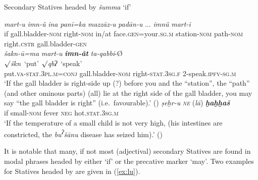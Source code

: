 \documentclass[output=paper,colorlinks,citecolor=brown]{langscibook}
\begin{document}
\begin{exe}  \ex Secondary Statives headed by \textit{šumma} `if' \label{ex:secondarystativescollection}
  \begin{xlist} \ex \label{ex:summaa} \gll {} \textit{mart-u} \textit{imn-û} \textit{ina} \textit{panī=ka} \textit{mazzāz-u} \textit{padān-u} ... \textit{imnû} \textit{mart-i}    \\
  if {gall.bladder}-\textsc{nom} right-\textsc{nom} in/at face.\textsc{gen}=your.\textsc{sg.m}    station-\textsc{nom}  path-\textsc{nom} {} right.\textsc{cstr} {gall.bladder}-\textsc{gen} \\
  \glll     \textit{šakn-ū=ma} \textit{mart-u} {\textit{\textbf{imn-ât}}} \textit{ta-qabbi}-Ø\\
   ${\surd}$\textit{škn}~`put' {} {}  
      ${\surd}$\textit{qbʔ}~`speak' \\
 put.\textsc{va-stat.3pl.m=conj}   {gall.bladder}-\textsc{nom} right-\textsc{stat.3sg.f}       2-speak.\textsc{ipfv-sg.m}\\
    \glt `If the gall bladder is right-side up (?) before you and the “station”, the “path” (and other ominous parts) (all) lie at the right side of the gall bladder, you may say “the gall bladder is right” (i.e.\ favourable).' ()
\ex \gll {} \textit{ṣeḫr-u} \textit{\textsc{ne}} (\textit{lā}) \textit{\textbf{ḫaḫḫaš}}\\
     if small-\textsc{nom} fever \textsc{neg} hot.\textsc{stat.3sg.m}\\
    \glt `If the temperature of a small child is not very high, (his intestines are constricted, the \emph{bu\textsuperscript{ʔ}šānu} disease has seized him).' ()
\end{xlist}
\end{exe}

 It is notable that many, if not most (adjectival) secondary Statives are found in modal phrases headed by either  `if' or the precative marker  `may'. Two examples for Statives headed by  are given in (\ref{ex:lu}).
\end{document}
